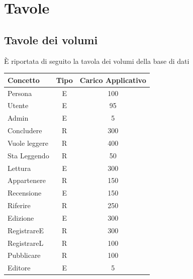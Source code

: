 \documentclass{article}
\begin{document}
\section{Tavole}

\subsection{Tavole dei volumi}
È riportata di seguito la tavola dei volumi della base di dati

\begin{center}
	\renewcommand{\arraystretch}{1.5} %
	\begin{longtable}{|l|c|c|}
		\hline
		\textbf{Concetto} & \textbf{Tipo} & \textbf{Carico Applicativo} \\
		\hline
		\endfirsthead
		Persona           & E             & 100                         \\
		\hline
		Utente            & E             & 95                          \\
		\hline
		Admin             & E             & 5                           \\
		\hline
		Concludere        & R             & 300                         \\
		\hline
		Vuole leggere     & R             & 400                         \\
		\hline
		Sta Leggendo      & R             & 50                          \\
		\hline
		Lettura           & E             & 300                         \\
		\hline
		Appartenere       & R             & 150                         \\
		\hline
		Recensione        & E             & 150                         \\
		\hline
		Riferire          & R             & 250                         \\
		\hline
		Edizione          & E             & 300                         \\
		\hline
		RegistrareE       & R             & 300                         \\
		\hline
		RegistrareL       & R             & 100                         \\
		\hline
		Pubblicare        & R             & 100                         \\
		\hline
		Editore           & E             & 5                           \\

\end{longtable}
\end{center}
\end{document}
